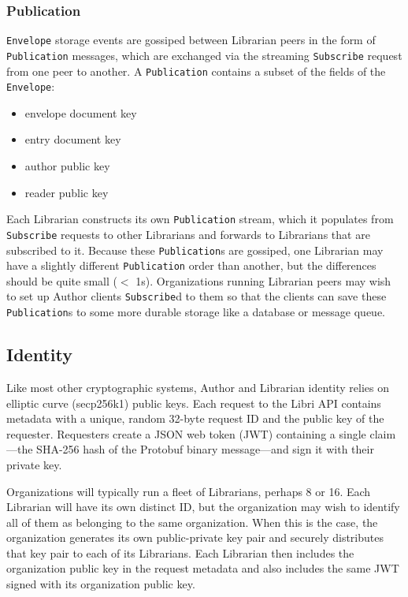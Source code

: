 \documentclass[10pt]{article}
\newcommand{\ttt}[1]{\texttt{#1}}
\def\Envelope{\ttt{Envelope}}
\def\Publication{\ttt{Publication}}
\begin{document}
\subsubsection{Publication}

\Envelope{} storage events are gossiped between Librarian peers in the form of \Publication{} messages, which are exchanged via the streaming \ttt{Subscribe} request from one peer to another. A \Publication{} contains a subset of the fields of the \Envelope{}:
\begin{itemize}
	\item envelope document key
	\item entry document key
	\item author public key
	\item reader public key
\end{itemize}

Each Librarian constructs its own \Publication{} stream, which it populates from \ttt{Subscribe} requests to other Librarians and forwards to Librarians that are subscribed to it. Because these \texttt{Publication}s are gossiped, one Librarian may have a slightly different \Publication{} order than another, but the differences should be quite small ($<$ 1s). Organizations running Librarian peers may wish to set up Author clients \ttt{Subscribe}d to them so that the clients can save these \Publication{}s to some more durable storage like a database or message queue. 

\subsection{Identity}
\label{sec:Identity}
Like most other cryptographic systems, Author and Librarian identity relies on elliptic curve (secp256k1) public keys. Each request to the Libri API contains metadata with a unique, random 32-byte request ID and the public key of the requester. Requesters create a JSON web token (JWT) containing a single claim---the SHA-256 hash of the Protobuf binary message---and sign it with their private key. 

Organizations will typically run a fleet of Librarians, perhaps 8 or 16. Each Librarian will have its own distinct ID, but the organization may wish to identify all of them as belonging to the same organization. When this is the case, the organization generates its own public-private key pair and securely distributes that key pair to each of its Librarians. Each Librarian then includes the organization public key in the request metadata and also includes the same JWT signed with its organization public key.
\end{document}
